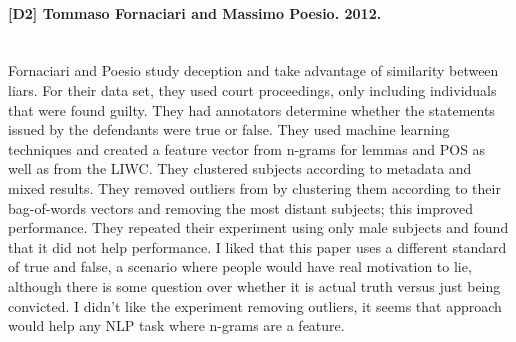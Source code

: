 \documentclass[12pt]{article}
\begin{document}
\paragraph{{\bf [D2] Tommaso Fornaciari and Massimo Poesio. 2012.}}
\text{} \\
Fornaciari and Poesio study deception and take advantage of similarity between liars.  
For their data set, they used court proceedings, only including individuals that
were found guilty.  They had annotators determine whether the statements issued by
the defendants were true or false.
They used machine learning techniques and created a feature vector from n-grams for lemmas
and POS as well as from the LIWC.  
They clustered subjects according to metadata and mixed results.
They removed outliers from by clustering them according to their bag-of-words vectors
and removing the most distant subjects; this improved performance.
They repeated their experiment using only male subjects and found that it did not help
performance.
I liked that this paper uses a different standard of true and false, a scenario where
people would have real motivation to lie, although there is some question over
whether it is actual truth versus just being convicted.
I didn't like the experiment removing outliers, it seems that approach would help
any NLP task where n-grams are a feature.
\end{document}
